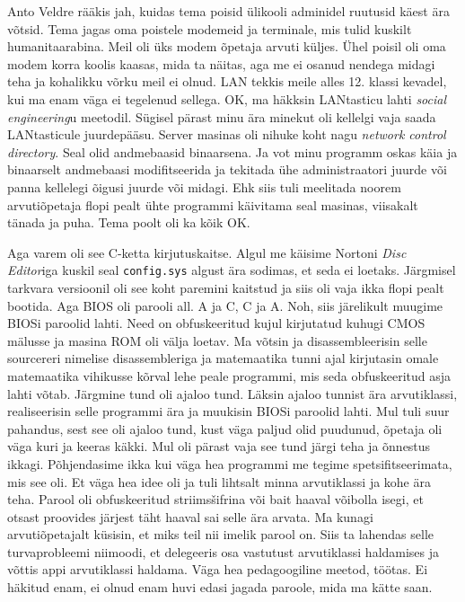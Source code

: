 Anto Veldre rääkis jah, kuidas tema poisid ülikooli adminidel ruutusid käest ära võtsid. Tema jagas oma poistele modemeid ja terminale, mis tulid kuskilt humanitaarabina. Meil oli üks modem õpetaja arvuti küljes. Ühel poisil oli oma modem korra koolis kaasas, mida ta näitas, aga me ei osanud nendega midagi teha ja kohalikku võrku meil ei olnud. LAN tekkis meile alles 12. klassi kevadel, kui ma enam väga ei tegelenud sellega. OK, ma häkksin LANtasticu lahti \emph{social engineering}u meetodil. Sügisel pärast minu ära minekut oli kellelgi vaja saada LANtasticule juurdepääsu. Server masinas oli nihuke koht nagu \emph{network control directory}. Seal olid andmebaasid binaarsena. Ja vot minu programm oskas käia ja binaarselt andmebaasi modifitseerida ja tekitada ühe administraatori juurde või panna kellelegi õigusi juurde või midagi. Ehk siis tuli meelitada noorem arvutiõpetaja flopi pealt ühte programmi käivitama seal masinas, viisakalt tänada ja puha. Tema poolt oli ka kõik OK. 

Aga varem oli see C-ketta kirjutuskaitse. Algul me käisime Nortoni \emph{Disc Editor}iga kuskil seal \verb|config.sys| algust ära sodimas, et seda ei loetaks. Järgmisel tarkvara versioonil oli see koht paremini kaitstud ja siis oli vaja ikka flopi pealt bootida. Aga BIOS oli parooli all. A ja C, C ja A. Noh, siis järelikult muugime BIOSi paroolid lahti. Need on obfuskeeritud kujul kirjutatud kuhugi CMOS mälusse ja masina ROM oli välja loetav. Ma võtsin ja disassembleerisin selle sourcereri nimelise disassembleriga ja matemaatika tunni ajal kirjutasin omale matemaatika vihikusse kõrval lehe peale programmi, mis seda obfuskeeritud asja lahti võtab. Järgmine tund oli ajaloo tund. Läksin ajaloo tunnist ära arvutiklassi, realiseerisin selle programmi ära ja muukisin BIOSi paroolid lahti. Mul tuli suur pahandus, sest see oli ajaloo tund, kust väga paljud olid puudunud, õpetaja oli väga kuri ja keeras käkki. Mul oli pärast vaja see tund järgi teha ja õnnestus ikkagi. Põhjendasime ikka kui väga hea programmi me tegime spetsifitseerimata, mis see oli. Et väga hea idee oli ja tuli lihtsalt minna arvutiklassi ja kohe ära teha. Parool oli obfuskeeritud striimsšifrina või bait haaval võibolla isegi, et otsast proovides järjest täht haaval sai selle ära arvata. Ma kunagi arvutiõpetajalt küsisin, et miks teil nii imelik parool on. Siis ta lahendas selle turvaprobleemi niimoodi, et delegeeris osa vastutust arvutiklassi haldamises ja võttis appi arvutiklassi haldama. Väga hea pedagoogiline meetod, töötas. Ei häkitud enam, ei olnud enam huvi edasi jagada paroole, mida ma kätte saan. 

